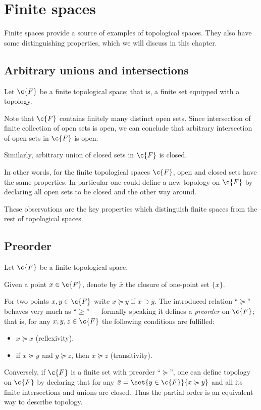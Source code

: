 \chapter{Finite spaces}

Finite spaces provide a source of examples of topological spaces.
They also have some distinguishing properties, which we will discuss in this chapter.

\section{Arbitrary unions and intersections}

Let $\c{F}$ be a finite topological space;
that is, a finite set equipped with a topology.

Note that $\c{F}$ contains finitely many distinct open sets.
Since intersection of finite collection of open sets is open,
we can conclude that arbitrary intersection of open sets in $\c{F}$ is open.

Similarly, arbitrary union of closed sets in $\c{F}$ is closed.

In other words, for the finite topological spaces $\c{F}$, open and closed sets have the same properties.
In particular one could define a new topology on $\c{F}$ by declaring all open sets to be closed and the other way around.

These observations are the key properties which distinguish finite spaces from the rest of topological spaces.

\section{Preorder}

Let $\c{F}$ be a finite topological space.

Given a point $x\in \c{F}$,
denote by $\bar x$ the closure of one-point set $\{x\}$.

For two points $x,y\in \c{F}$ write $x\succcurlyeq y$ if $\bar x\supset \bar y$.
The introduced relation ``$\succcurlyeq$'' behaves very much as ``$\ge$'' --- formally speaking it defines a \emph{preorder} on $\c{F}$;
that is, for any $x,y,z\in\c{F}$ the following conditions are fulfilled: 
\begin{itemize}
\item $x\succcurlyeq x$ (reflexivity).
\item if $x\succcurlyeq y$ and $y\succcurlyeq z$, then $x\succcurlyeq z$ (transitivity).
\end{itemize}

Conversely, if $\c{F}$ is a finite set with preorder ``$\succcurlyeq$'',
one can define topology on $\c{F}$ by declaring that for any $\bar x=\set{y\in \c{F}}{x\succcurlyeq y}$ and all its finite intersections and unions are closed.
Thus the partial order is an equivalent way to describe topology.




